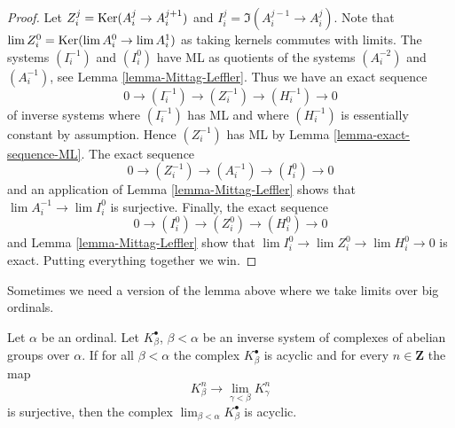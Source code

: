 \begin{proof}
Let $Z^j_i = \mathop{\mathrm{Ker}}(A^j_i \to A^{j + 1}_i)$ and
$I^j_i = \Im(A^{j - 1}_i \to A^j_i)$.
Note that $\mathop{\mathrm{lim}}\nolimits Z^0_i = \mathop{\mathrm{Ker}}(\mathop{\mathrm{lim}}\nolimits A^0_i \to \mathop{\mathrm{lim}}\nolimits A^1_i)$ as
taking kernels commutes with limits.
The systems $(I^{-1}_i)$ and $(I^0_i)$ have ML as quotients of
the systems $(A^{-2}_i)$ and $(A^{-1}_i)$, see
Lemma \ref{lemma-Mittag-Leffler}.
Thus we have an exact sequence
$$
0 \to (I^{-1}_i) \to (Z^{-1}_i) \to (H^{-1}_i) \to 0
$$
of inverse systems where $(I^{-1}_i)$ has ML
and where $(H^{-1}_i)$ is essentially constant by assumption.
Hence $(Z^{-1}_i)$ has ML by
Lemma \ref{lemma-exact-sequence-ML}.
The exact sequence
$$
0 \to (Z^{-1}_i) \to (A^{-1}_i) \to (I^0_i) \to 0
$$
and an application of
Lemma \ref{lemma-Mittag-Leffler}
shows that $\lim A^{-1}_i \to \lim I^0_i$ is surjective.
Finally, the exact sequence
$$
0 \to (I^0_i) \to (Z^0_i) \to (H^0_i) \to 0
$$
and
Lemma \ref{lemma-Mittag-Leffler}
show that $\lim I^0_i \to \lim Z^0_i \to \lim H^0_i \to 0$
is exact. Putting everything together we win.
\end{proof}

\noindent
Sometimes we need a version of the lemma above where we take limits
over big ordinals.

\begin{lemma}
\label{lemma-ML-over-ordinals}
Let $\alpha$ be an ordinal. Let $K_\beta^\bullet$, $\beta < \alpha$
be an inverse system of complexes of abelian groups over $\alpha$. If
for all $\beta < \alpha$ the complex $K_\beta^\bullet$ is acyclic and
for every $n \in \mathbf{Z}$ the map
$$
K^n_\beta \longrightarrow \lim_{\gamma < \beta} K^n_\gamma
$$
is surjective, then the complex
$\lim_{\beta < \alpha} K_\beta^\bullet$ is acyclic.
\end{lemma}

